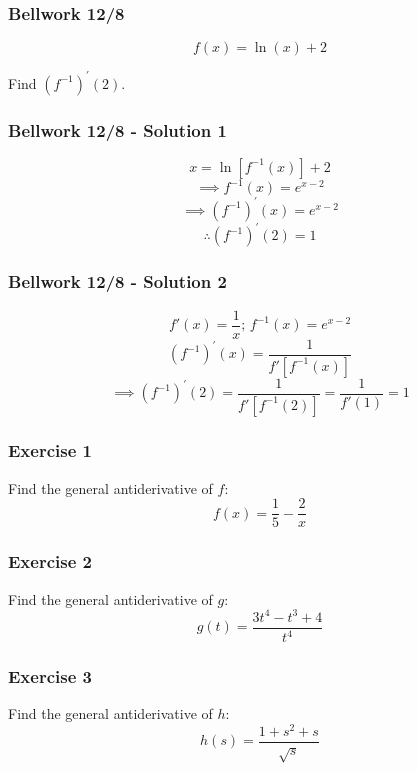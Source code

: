 \documentclass[12pt]{beamer}
\begin{document}
\begin{frame}
	\frametitle{Bellwork 12/8}
	\initclock

	\vfill
	\LARGE
	\[f(x)=\ln(x)+2\]
	\vfill
	\begin{center}
		Find $(f^{-1})^{'}(2)$.
	\end{center}
	\vfill
	\vfill
	\vfill
	\vfill
	\vfill
	\vfill

	\small
	\crono
\end{frame}
\begin{frame}
	\frametitle{Bellwork 12/8 - Solution 1}

	\Large
	\[x=\ln[f^{-1}(x)]+2\]
	\[\implies f^{-1}(x)=e^{x-2}\]
	\[\implies (f^{-1})^{'}(x)=e^{x-2}\]
	\vfill
	\[\therefore \boxed{(f^{-1})^{'}(2)=1}\]
\end{frame}
\begin{frame}
	\frametitle{Bellwork 12/8 - Solution 2}

	\Large
	\[f'(x)=\frac{1}{x}\text{; }f^{-1}(x)=e^{x-2}\]
	\vfill
	\[(f^{-1})^{'}(x)=\frac{1}{f'[f^{-1}(x)]}\]
	\[\implies (f^{-1})^{'}(2)=\frac{1}{f'[f^{-1}(2)]}=\frac{1}{f'(1)}=\boxed{1}\]
\end{frame}
\begin{frame}
	\frametitle{Exercise 1}

	\Large
	Find the general antiderivative of $f$:
	\[f(x)=\frac{1}{5}-\frac{2}{x}\]
\end{frame}
\begin{frame}
	\frametitle{Exercise 2}

	\Large
	Find the general antiderivative of $g$:
	\[g(t)=\frac{3t^4-t^3+4}{t^4}\]
\end{frame}
\begin{frame}
	\frametitle{Exercise 3}

	\Large
	Find the general antiderivative of $h$:
	\[h(s)=\frac{1+s^2+s}{\sqrt{s}}\]
\end{frame}
\end{document}
